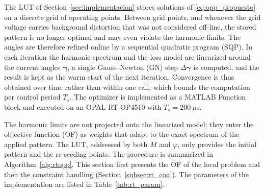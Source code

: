\documentclass[conference]{IEEEtran}
\newcommand{\gv}{\boldsymbol{\gamma}}
\newcommand{\upd}[1]{\par\smallskip\noindent{\color{red}\footnotesize
    \textbf{[ACTUALIZAR]} #1}\par\smallskip}
\renewcommand{\upd}[1]{}       %
\begin{document}
The LUT of Section~\ref{sec:implementacion} stores solutions of
\eqref{eq:opp_propuesto} on a discrete grid of operating points. Between
grid points, and whenever the grid voltage carries background distortion
that was not considered off-line, the stored pattern is no longer optimal
and may even violate the harmonic limits. The angles are therefore refined
online by a sequential quadratic program (SQP). In each iteration the
harmonic spectrum and the loss model are linearized around the current
angles $\gv$, a single Gauss--Newton (GN) step $\Delta\gv$ is computed,
and the result is kept as the warm start of the next iteration. Convergence is thus obtained over time rather than
within one call, which bounds the computation per control period $T_s$.
The optimizer is implemented as a MATLAB Function block and executed on an
OPAL-RT OP4510 with $T_s=200~\mu$s.
\upd{Pendiente (autor): tiempo de ejecucion medido del optimizador en el
OP4510 frente a $T_s = 200~\mu$s; agregarlo aqui y en el abstract.}
The harmonic limits are not projected onto
the linearized model; they enter the objective function (OF) as weights
that adapt to the exact spectrum of the applied pattern. The LUT, addressed
by both $M$ and $\varphi$, only provides the initial pattern and the
re-seeding points. The procedure is summarized in Algorithm~\ref{alg:rtopp}.
This section first presents the OF of the local
problem and then the constraint handling
(Section~\ref{subsec:rt_con}). The parameters of the implementation are
listed in Table~\ref{tab:rt_param}.
\end{document}
